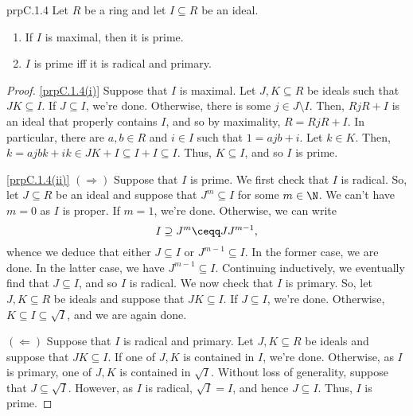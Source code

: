 \begin{prp}{}{prpC.1.4}
	Let $R$ be a ring and let $I\subseteq R$ be an ideal.
	\begin{enumerate}
		\item \label{prpC.1.4(i)}If $I$ is maximal, then it is prime.
		\item \label{prpC.1.4(ii)}$I$ is prime iff it is radical and primary.
	\end{enumerate}
	\begin{proof}
		\cref{prpC.1.4(i)} Suppose that $I$ is maximal.  Let $J,K\subseteq R$ be ideals such that $JK\subseteq I$.  If $J\subseteq I$, we're done.  Otherwise, there is some $j\in J\setminus I$.  Then, $RjR+I$ is an ideal that properly contains $I$, and so by maximality, $R=RjR+I$.  In particular, there are $a,b\in R$ and $i\in I$ such that $1=ajb+i$.  Let $k\in K$.  Then, $k=ajbk+ik\in JK+I\subseteq I+I\subseteq I$.  Thus, $K\subseteq I$, and so $I$ is prime.
		
		\blni
		\cref{prpC.1.4(ii)} $(\Rightarrow )$ Suppose that $I$ is prime.  We first check that $I$ is radical.  So, let $J\subseteq R$ be an ideal and suppose that $J^m\subseteq I$ for some $m\in \N$.  We can't have $m=0$ as $I$ is proper.  If $m=1$, we're done.  Otherwise, we can write
		\begin{equation}
			I\supseteq J^m\ceqq JJ^{m-1},
		\end{equation}
		whence we deduce that either $J\subseteq I$ or $J^{m-1}\subseteq I$.  In the former case, we are done.  In the latter case, we have $J^{m-1}\subseteq I$.  Continuing inductively, we eventually find that $J\subseteq I$, and so $I$ is radical.  We now check that $I$ is primary.  So, let $J,K\subseteq R$ be ideals and suppose that $JK\subseteq I$.  If $J\subseteq I$, we're done.  Otherwise, $K\subseteq I\subseteq \sqrt{I}$, and we are again done.

		$(\Leftarrow )$ Suppose that $I$ is radical and primary.  Let $J,K\subseteq R$ be ideals and suppose that $JK\subseteq I$.  If one of $J,K$ is contained in $I$, we're done.  Otherwise, as $I$ is primary, one of $J,K$ is contained in $\sqrt{I}$.  Without loss of generality, suppose that $J\subseteq \sqrt{I}$.  However, as $I$ is radical, $\sqrt{I}=I$, and hence $J\subseteq I$.  Thus, $I$ is prime.
	\end{proof}
\end{prp}

